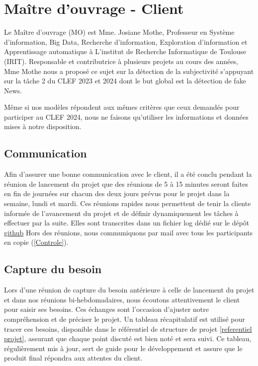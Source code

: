 \documentclass[11pt]{rapport_class}
\begin{document}
\section{Maître d'ouvrage - Client}
\qquad Le Maître d'ouvrage (MO) est Mme. Josiane Mothe, Professeur en Système d'information, Big Data, Recherche d'information, Exploration d'information et Apprentissage automatique à L'institut de Recherche Informatique de Toulouse (IRIT). Responsable et contributrice à plusieurs projets au cours des années, Mme Mothe nous a proposé ce sujet sur la détection de la subjectivité s'appuyant sur la tâche 2 du CLEF 2023 et 2024 dont le but global est la détection de fake News.

Même si nos modèles répondent aux mêmes critères que ceux demandés pour participer au CLEF 2024, nous ne faisons qu'utiliser les informations et données mises à notre disposition.

\subsection{Communication}
\label{ logs reunions }
\qquad Afin d'assurer une bonne communication avec le client, il a été conclu pendant la réunion de lancement du projet que des réunions de 5 à 15 minutes seront faites en fin de journées sur chacun des deux jours prévus pour le projet dans la semaine, lundi et mardi. Ces réunions rapides nous permettent de tenir la cliente informée de l'avancement du projet et de définir dynamiquement les tâches à effectuer par la suite. Elles sont transcrites dans un fichier log dédié sur le dépôt \href{https://github.com/fghjklm/Projet_M1_CheckThat-/tree/main/log_reunions}{github} Hors des réunions, nous communiquons par mail avec tous les participants en copie (\ref{Controle}). 


\subsection{Capture du besoin}


\qquad Lors d'une réunion de capture du besoin antérieure à celle de lancement du projet et dans nos réunions bi-hebdomadaires, nous écoutons attentivement le client pour saisir ses besoins. Ces échanges sont l'occasion d'ajuster notre compréhension et de préciser le projet. Un tableau récapitulatif est utilisé pour tracer ces besoins, disponible dans le  référentiel de structure de projet \ref{referentiel projet}, assurant que chaque point discuté est bien noté et sera suivi. Ce tableau, régulièrement mis à jour, sert de guide pour le développement et assure que le produit final répondra aux attentes du client.
\end{document}
